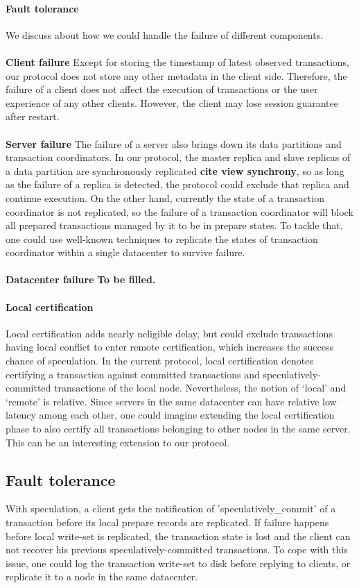 \paragraph{Fault tolerance}
We discuss about how we could handle the failure of different components.\\\\
\textbf{Client failure} Except for storing the timestamp of latest observed transactions, our protocol does not store any other metadata in the client side. Therefore, the failure of a client does not affect the execution of transactions or the user experience of any other clients. However, the client may lose session guarantee after restart.\\\\
\textbf{Server failure} The failure of a server also brings down its data partitions and transaction coordinators. In our protocol, the master replica and slave replicas of a data partition are synchronously replicated  \textbf{cite view synchrony}, so as long as the failure of a replica is detected, the protocol could exclude that replica and continue execution. On the other hand, currently the state of a transaction coordinator is not replicated, so the failure of a transaction coordinator will block all prepared transactions managed by it to be in prepare states. To tackle that, one could use well-known techniques to replicate the states of transaction coordinator within a single datacenter to survive failure.\\\\
\textbf{Datacenter failure} \textbf{To be filled.}

\paragraph{Local certification}
Local certification adds nearly neligible delay, but could exclude transactions having local conflict to enter remote certification, which increases the success chance of speculation. In the current protocol, local certification denotes certifying a transaction against committed transactions and speculatively-committed transactions of the local node. Nevertheless, the notion of `local' and `remote' is relative. Since servers in the same datacenter can have relative low latency among each other, one could imagine extending the local certification phase to also certify all transactions belonging to other nodes in the same server. This can be an interesting extension to our protocol.

\subsection{Fault tolerance}
With speculation, a client gets the notification of 'speculatively\_commit' of a transaction before its local prepare records are replicated. If failure happens before local write-set is replicated, the transaction state is lost and the client can not recover his previous speculatively-committed transactions. To cope with this issue, one could log the transaction write-set to disk before replying to clients, or replicate it to a node in the same datacenter.
\fi
